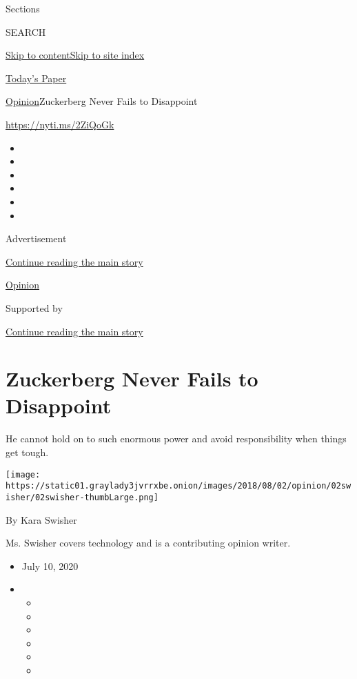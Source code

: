 Sections

SEARCH

\protect\hyperlink{site-content}{Skip to
content}\protect\hyperlink{site-index}{Skip to site index}

\href{https://myaccount.nytimes3xbfgragh.onion/auth/login?response_type=cookie\&client_id=vi}{}

\href{https://www.nytimes3xbfgragh.onion/section/todayspaper}{Today's
Paper}

\href{/section/opinion}{Opinion}\textbar{}Zuckerberg Never Fails to
Disappoint

\url{https://nyti.ms/2ZiQoGk}

\begin{itemize}
\item
\item
\item
\item
\item
\item
\end{itemize}

Advertisement

\protect\hyperlink{after-top}{Continue reading the main story}

\href{/section/opinion}{Opinion}

Supported by

\protect\hyperlink{after-sponsor}{Continue reading the main story}

\hypertarget{zuckerberg-never-fails-to-disappoint}{%
\section{Zuckerberg Never Fails to
Disappoint}\label{zuckerberg-never-fails-to-disappoint}}

He cannot hold on to such enormous power and avoid responsibility when
things get tough.

\texttt{[image: https://static01.graylady3jvrrxbe.onion/images/2018/08/02/opinion/02swisher/02swisher-thumbLarge.png]}

By Kara Swisher

Ms. Swisher covers technology and is a contributing opinion writer.

\begin{itemize}
\item
  July 10, 2020
\item
  \begin{itemize}
  \item
  \item
  \item
  \item
  \item
  \item
  \end{itemize}
\end{itemize}

